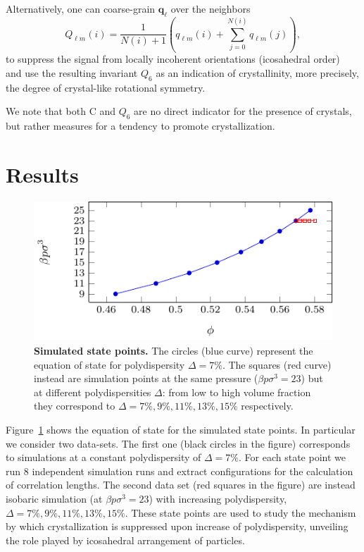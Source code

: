 \documentclass[twocolumn,superscriptaddress]{revtex4}
\begin{document}
Alternatively, one can coarse-grain $\mathbf{q}_\ell$ over the neighbors~\cite{lechner}
\begin{equation}
	Q_{\ell m}(i) = \frac{1}{N(i)+1}\left( q_{\ell m}(i) +  \sum_{j=0}^{N(i)} q_{\ell m}(j)\right), 
	\label{eq:Qlm}
\end{equation}
to suppress the signal from locally incoherent orientations (icosahedral order)~\cite{mathieu_icosahedra} and use the resulting invariant $Q_6$ as an indication of crystallinity, more precisely, the degree of crystal-like rotational symmetry.

We note that both $\text{C}$ and $Q_6$ are no direct indicator for the presence of crystals, but rather measures for a tendency to promote crystallization.

\section{Results}\label{sec:results}

\begin{figure}
 \centering
 \includegraphics{fig_eos}
 \caption{\textbf{Simulated state points.} The circles (blue curve) represent the equation of state for polydispersity $\Delta=7\%$. The squares (red curve) instead are simulation points at the same pressure ($\beta p\sigma^3=23$) but at different polydispersities $\Delta$: from low to high volume fraction they correspond to $\Delta=7\%,9\%,11\%,13\%,15\%$ respectively.}
 \label{fig:eos}
\end{figure}


Figure~\ref{fig:eos} shows the equation of state for the simulated state points. In particular
we consider two data-sets. The first one (black circles in the figure) corresponds to
simulations at a constant polydispersity of $\Delta=7\%$. For each state point we run $8$ independent
simulation runs and extract configurations for the calculation of correlation lengths.
The second data set (red squares in the figure) are instead isobaric simulation (at $\beta p\sigma^3=23$)
with increasing polydispersity, $\Delta=7\%,9\%,11\%,13\%,15\%$. These state points are used to study
the mechanism by which crystallization is suppressed upon increase of polydispersity, unveiling the
role played by icosahedral arrangement of particles.
\end{document}
